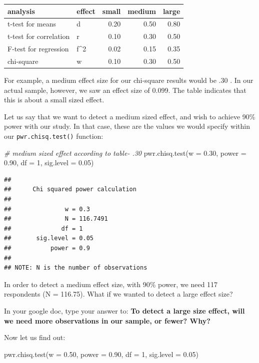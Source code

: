 \documentclass[
]{book}
\newenvironment{Shaded}{\begin{snugshade}}{\end{snugshade}}
\newcommand{\AttributeTok}[1]{\textcolor[rgb]{0.77,0.63,0.00}{#1}}
\newcommand{\CommentTok}[1]{\textcolor[rgb]{0.56,0.35,0.01}{\textit{#1}}}
\newcommand{\DecValTok}[1]{\textcolor[rgb]{0.00,0.00,0.81}{#1}}
\newcommand{\FloatTok}[1]{\textcolor[rgb]{0.00,0.00,0.81}{#1}}
\newcommand{\FunctionTok}[1]{\textcolor[rgb]{0.00,0.00,0.00}{#1}}
\newcommand{\NormalTok}[1]{#1}
\begin{document}
\begin{tabular}{l|l|r|r|r}
\hline
analysis & effect & small & medium & large\\
\hline
t-test for means & d & 0.20 & 0.50 & 0.80\\
\hline
t-test for correlation & r & 0.10 & 0.30 & 0.50\\
\hline
F-test for regression & f\textasciicircum{}2 & 0.02 & 0.15 & 0.35\\
\hline
chi-square & w & 0.10 & 0.30 & 0.50\\
\hline
\end{tabular}

For example, a medium effect size for our chi-square results would be .30 . In our actual sample, however, we saw an effect size of 0.099. The table indicates that this is about a small sized effect.

Let us say that we want to detect a medium sized effect, and wish to achieve 90\% power with our study. In that case, these are the values we would specify within our \texttt{pwr.chisq.test()} function:

\begin{Shaded}
\begin{Highlighting}[]
\CommentTok{\# medium sized effect according to table{-} .30}
\FunctionTok{pwr.chisq.test}\NormalTok{(}\AttributeTok{w =} \FloatTok{0.30}\NormalTok{, }\AttributeTok{power =} \FloatTok{0.90}\NormalTok{, }\AttributeTok{df =} \DecValTok{1}\NormalTok{, }\AttributeTok{sig.level =} \FloatTok{0.05}\NormalTok{)}
\end{Highlighting}
\end{Shaded}

\begin{verbatim}
## 
##      Chi squared power calculation 
## 
##               w = 0.3
##               N = 116.7491
##              df = 1
##       sig.level = 0.05
##           power = 0.9
## 
## NOTE: N is the number of observations
\end{verbatim}

In order to detect a medium effect size, with 90\% power, we need 117 respondents (N = 116.75). What if we wanted to detect a large effect size?

In your google doc, type your answer to:
\textbf{To detect a large size effect, will we need more observations in our sample, or fewer? Why?}

Now let us find out:

\begin{Shaded}
\begin{Highlighting}[]
\FunctionTok{pwr.chisq.test}\NormalTok{(}\AttributeTok{w =} \FloatTok{0.50}\NormalTok{, }\AttributeTok{power =} \FloatTok{0.90}\NormalTok{, }\AttributeTok{df =} \DecValTok{1}\NormalTok{, }\AttributeTok{sig.level =} \FloatTok{0.05}\NormalTok{)}
\end{Highlighting}
\end{Shaded}
\end{document}
